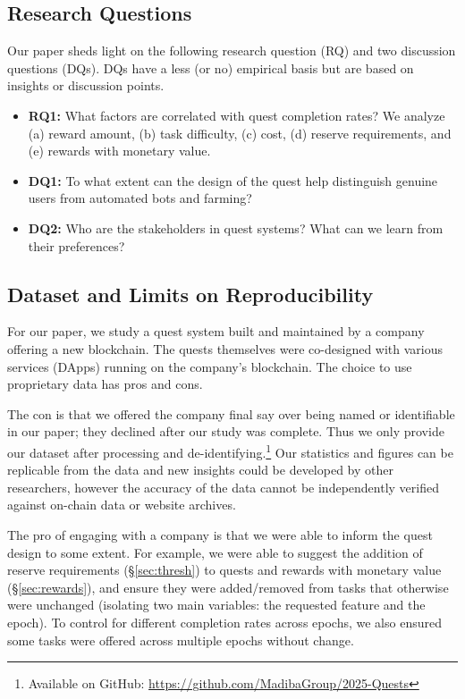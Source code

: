 
\subsection{Research Questions} 
Our paper sheds light on the following research question (RQ) and two discussion questions (DQs). DQs have a less (or no) empirical basis but are based on insights or discussion points. 

\begin{itemize}
\item \textbf{RQ1:} What factors are correlated with quest completion rates? We analyze (a) reward amount, (b) task difficulty, (c) cost, (d) reserve requirements, and (e) rewards with monetary value.
\item \textbf{DQ1:} To what extent can the design of the quest help distinguish genuine users from automated bots and farming?
\item \textbf{DQ2:} Who are the stakeholders in quest systems? What can we learn from their preferences?
\end{itemize}


\subsection{Dataset and Limits on Reproducibility}

For our paper, we study a quest system built and maintained by a company offering a new blockchain. The quests themselves were co-designed with various services (DApps) running on the company's blockchain. The choice to use proprietary data has pros and cons. 

The con is that we offered the company final say over being named or identifiable in our paper; they declined after our study was complete. Thus we only provide our dataset after processing and de-identifying.\footnote{Available on GitHub: \url{https://github.com/MadibaGroup/2025-Quests}} Our statistics and figures can be replicable from the data and new insights could be developed by other researchers, however the accuracy of the data cannot be independently verified against on-chain data or website archives.

The pro of engaging with a company is that we were able to inform the quest design to some extent. For example, we were able to suggest the addition of reserve requirements (§\ref{sec:thresh}) to quests and rewards with monetary value (§\ref{sec:rewards}), and ensure they were added/removed from tasks that otherwise were unchanged (isolating two main variables: the requested feature and the epoch). To control for different completion rates across epochs, we also ensured some tasks were offered across multiple epochs without change.

